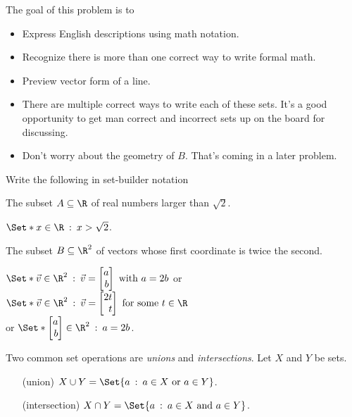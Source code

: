 \documentclass{problemset}
\newcommand{\mat}[1]{\begin{bmatrix*}[r]#1\end{bmatrix*}}
\providecommand\given{}
\newcommand\SetSymbol[1][]{%
	\nonscript\::%
	\allowbreak
	\nonscript\:
	\mathopen{}}
\renewcommand\given{\SetSymbol[\delimsize]}
\begin{document}
	\question
	\begin{annotation}
		\begin{goals}

			The goal of this problem is to
			\begin{itemize}
				\item Express English descriptions using math notation.
				\item Recognize there is more than one correct way to
					write formal math.
				\item Preview vector form of a line.
			\end{itemize}
		\end{goals}

		\begin{notes}
			\begin{itemize}
				\item There are multiple correct ways to write
					each of these sets. It's a good opportunity
					to get man correct and incorrect sets up on the
					board for discussing.
				\item Don't worry about the geometry of $B$. That's coming
					in a later problem.
			\end{itemize}
		\end{notes}
	\end{annotation}
		Write the following in set-builder notation
	\begin{parts}
			\item The subset $A\subseteq \R$ of real numbers larger than $\sqrt{2}$.
				\begin{solution}
					$\Set*{x\in\R \given x>\sqrt{2}}$.
				\end{solution}
			\item The subset $B\subseteq \R^2$ of vectors whose first coordinate
			is twice the second.
				\begin{solution}
					$\Set*{\vec v\in\R^2\given \vec v=\mat{a\\b}\text{ with }a=2b}$
					or
					$\Set*{\vec v\in\R^2\given\vec v=\mat{2t\\t}\text{ for some }t\in \R}$\\
					or
					$\Set*{\mat{a\\b}\in\R^2\given a=2b}$.
				\end{solution}
	\end{parts}

	\newpage
	\begin{definition}
		Two common set operations are \emph{unions} and \emph{intersections}.  
		Let $X$ and $Y$ be sets.

		\hfill\begin{minipage}{\dimexpr\textwidth-3cm}
		\begin{itemize}
			\item[(union)] $X\cup Y = \Set{ a \given a\in X\text{ or }a\in Y}$.
			\item[(intersection)] $X\cap Y = \Set{ a \given a\in X\text{ and }a\in Y}$.
		\end{itemize}
		\end{minipage}
	\end{definition}
\end{document}
